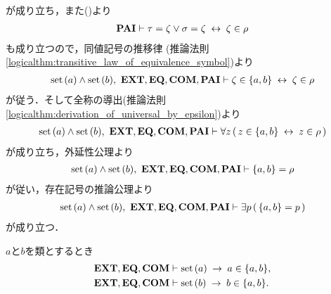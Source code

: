 \begin{sketch}
\begin{description}
				が成り立ち，また()より
				\begin{align}
					\PAIAX \vdash \tau = \zeta \vee \sigma = \zeta \lrarrow \zeta \in \rho
				\end{align}
				も成り立つので，同値記号の推移律
				(推論法則\ref{logicalthm:transitive_law_of_equivalence_symbol})より
				\begin{align}
					\set{a} \wedge \set{b},\ \EXTAX,\EQAX,\COMAX,\PAIAX \vdash 
					\zeta \in \{a,b\} \lrarrow \zeta \in \rho
				\end{align}
				が従う．そして全称の導出(推論法則\ref{logicalthm:derivation_of_universal_by_epsilon})より
				\begin{align}
					\set{a} \wedge \set{b},\ \EXTAX,\EQAX,\COMAX,\PAIAX \vdash 
					\forall z\, (\, z \in \{a,b\} \lrarrow z \in \rho\, )
				\end{align}
				が成り立ち，外延性公理より
				\begin{align}
					\set{a} \wedge \set{b},\ \EXTAX,\EQAX,\COMAX,\PAIAX \vdash 
					\{a,b\} = \rho
				\end{align}
				が従い，存在記号の推論公理より
				\begin{align}
					\set{a} \wedge \set{b},\ \EXTAX,\EQAX,\COMAX,\PAIAX \vdash 
					\exists p\, (\, \{a,b\} = p\, )
				\end{align}
				が成り立つ．
				\QED
		\end{description}
	\end{sketch}
	
	\begin{screen}
		\begin{thm}[集合は自分自身の対の要素である]
		\label{thm:set_is_an_element_of_its_pair}
			$a$と$b$を類とするとき
			\begin{align}
				\EXTAX,\EQAX,\COMAX &\vdash \set{a} \rarrow a \in \{a,b\}, \\
				\EXTAX,\EQAX,\COMAX &\vdash \set{b} \rarrow b \in \{a,b\}.
			\end{align}
		\end{thm}
	\end{screen}
	
